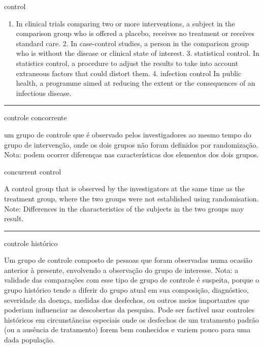 \documentclass[
  openany]{book}
\providecommand{\tightlist}{%
  \setlength{\itemsep}{0pt}\setlength{\parskip}{0pt}}
\begin{document}
control

\begin{enumerate}
\def\labelenumi{\arabic{enumi}.}
\tightlist
\item
  In clinical trials comparing two or more interventions, a subject in the comparison group who is offered a placebo, receives no treatment or receives standard care. 2. In case-control studies, a person in the comparison group who is without the disease or clinical state of interest. 3. statistical control. In statistics control, a procedure to adjust the results to take into account extraneous factors that could distort them. 4. infection control
  In public health, a programme aimed at reducing the extent or the consequences of an infectious disease.
\end{enumerate}

\begin{center}\rule{0.5\linewidth}{0.5pt}\end{center}

controle concorrente

um grupo de controle que é observado pelos investigadores ao mesmo tempo do grupo de intervenção, onde os dois grupos não foram definidos por randomização. Nota: podem ocorrer diferenças nas características dos elementos dos dois grupos.

concurrent control

A control group that is observed by the investigators at the same time as the treatment group, where the two groups were not established using randomisation. Note: Differences in the characteristics of the subjects in the two groups may result.

\begin{center}\rule{0.5\linewidth}{0.5pt}\end{center}

controle histórico

Um grupo de controle composto de pessoas que foram observadas numa ocasião anterior à presente, envolvendo a observação do grupo de interesse. Nota: a validade das comparações com esse tipo de grupo de controle é suspeita, porque o grupo histórico tende a diferir do grupo atual em sua composição, diagnóstico, severidade da doença, medidas dos desfechos, ou outros meios importantes que poderiam influenciar as descobertas da pesquisa. Pode ser factível usar controles históricos em circunstâncias especiais onde os desfechos de um tratamento padrão (ou a ausência de tratamento) forem bem conhecidos e variem pouco para uma dada população.
\end{document}

